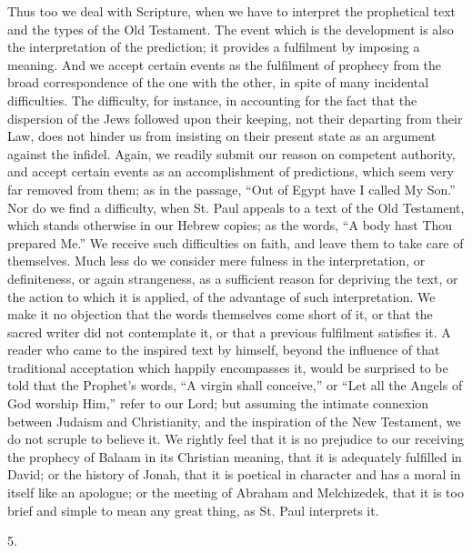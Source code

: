 Thus too we deal with Scripture, when we have to
interpret the prophetical text and the types of the Old
Testament. The event which is the development is also the
interpretation of the prediction; it provides a
fulfilment by imposing a meaning. And we accept certain
events as the fulfilment of prophecy from the broad
correspondence of the one with the other, in spite of
many incidental difficulties. The difficulty, for
instance, in accounting for the fact that the dispersion
of the Jews followed upon their keeping, not their
departing from their Law, does not hinder us from
insisting on their present state as an argument against
the infidel. Again, we readily submit our reason on
competent authority, and accept certain events as an
accomplishment of predictions, which seem very far
removed from them; as in the passage, ``Out of Egypt
have I called My Son.'' Nor do we find a difficulty,
when St. Paul appeals to a text of the Old Testament,
which stands otherwise in our Hebrew copies; as the
words, ``A body hast Thou prepared Me.'' We
receive such difficulties on faith, and leave them to
take care of themselves. Much less do we consider mere
fulness in the interpretation, or definiteness, or again
strangeness, as a sufficient reason for depriving the
text, or the action to which it is applied, of the
advantage of such interpretation. We make it no objection
that the words themselves come short of it, or that the
sacred writer did not contemplate it, or that a previous
fulfilment satisfies it. A reader who came to the
inspired text by himself, beyond the influence of that
traditional acceptation which happily encompasses it,
would be surprised to be told that the Prophet's words,
``A virgin shall conceive,'' or ``Let all the
Angels of God worship Him,'' refer to our Lord; but
assuming the intimate connexion between Judaism and
Christianity, and the inspiration of the New Testament,
we do not scruple to believe it. We rightly feel that it
is no prejudice to our receiving the prophecy of Balaam
in its Christian meaning, that it is adequately fulfilled
in David; or the history of Jonah, that it is poetical in
character and has a moral in itself like an apologue; or
the meeting of Abraham and Melchizedek, that it is too
brief and simple to mean any great thing, as St. Paul
interprets it.

5.


